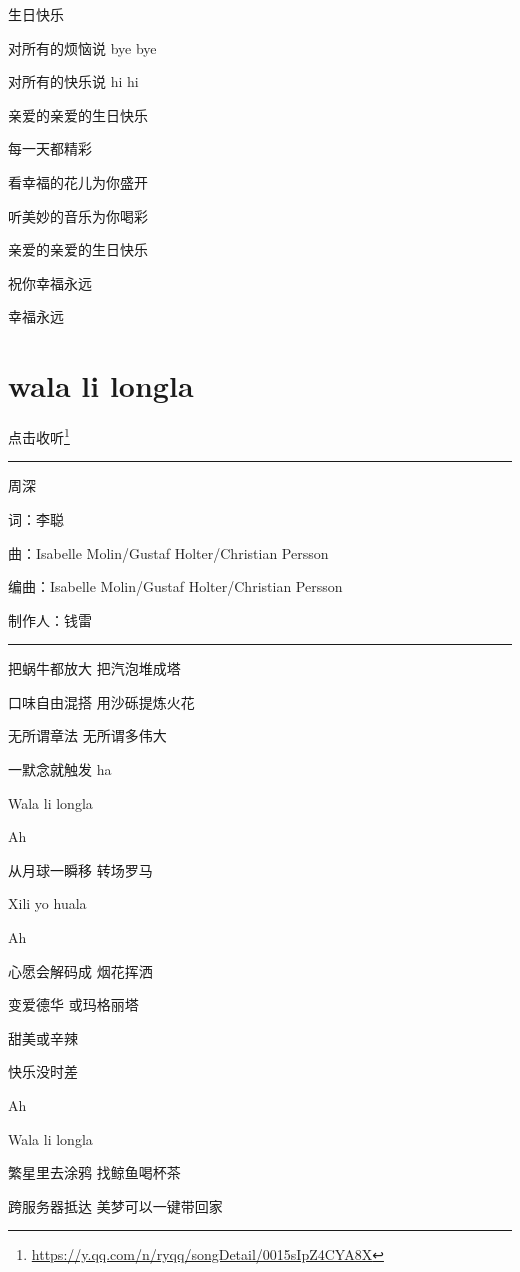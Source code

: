 \documentclass[]{ctexbook}
\renewcommand{\href}[2]{#2\footnote{\url{#1}}}
\begin{document}
生日快乐

对所有的烦恼说 bye bye

对所有的快乐说 hi hi

亲爱的亲爱的生日快乐

每一天都精彩

看幸福的花儿为你盛开

听美妙的音乐为你喝彩

亲爱的亲爱的生日快乐

祝你幸福永远

幸福永远

\section*{wala li longla}\label{wala-li-longla}


\href{https://y.qq.com/n/ryqq/songDetail/0015sIpZ4CYA8X}{点击收听}

\begin{center}\rule{0.5\linewidth}{0.5pt}\end{center}

周深

词：李聪

曲：Isabelle Molin/Gustaf Holter/Christian Persson

编曲：Isabelle Molin/Gustaf Holter/Christian Persson

制作人：钱雷

\begin{center}\rule{0.5\linewidth}{0.5pt}\end{center}

把蜗牛都放大 把汽泡堆成塔

口味自由混搭 用沙砾提炼火花

无所谓章法 无所谓多伟大

一默念就触发 ha

Wala li longla

Ah

从月球一瞬移 转场罗马

Xili yo huala

Ah

心愿会解码成 烟花挥洒

变爱德华 或玛格丽塔

甜美或辛辣

快乐没时差

Ah

Wala li longla

繁星里去涂鸦 找鲸鱼喝杯茶

跨服务器抵达 美梦可以一键带回家
\end{document}
